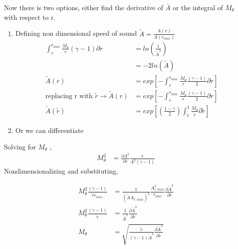 Now there is two options, either find the derivative of  $\bar{A}$ or the integral of
$M_{\theta}$ with respect to r.
\begin{enumerate}
    \item
%
Defining non dimensional speed of sound $\tilde{A} = \frac{A(r)}{A(r_{max})}$
\begin{align*}
\int_{r}^{r_{max}}\frac{M_{\theta}}{r}\left(\gamma - 1\right){\partial r}  &=ln\left(\frac{1}{\tilde{A}^2}\right) \\
&= -2ln(\tilde{A})\\
\tilde{A}(r) &= exp\left[-\int_{r}^{r_{max}}\frac{M_{\theta}}{r}\frac{\left(\gamma - 1\right)}{2}{\partial r}\right] \\ \text{replacing r with }\tilde{r} \rightarrow \tilde{A}(r) &= exp\left[-\int_{r}^{r_{max}}\frac{M_{\theta}}{r}\frac{\left(\gamma - 1\right)}{2}{\partial r}\right]		\\
\tilde{A}(\tilde{r}) &= exp\left[\left(\frac{1 - \gamma}{2}\right)\int_{\tilde{r}}^{1}\frac{M_{\theta}}{\tilde{r}}{\partial \tilde{r}}\right]	
\end{align*}
\item Or we can differentiate
\end{enumerate}
Solving for $M_{\theta}$ ,
\begin{align*}
M_{\theta}^2 
&= \frac{\partial A^2}{\partial r} \frac{r}{A^2 \left(\gamma - 1\right)}
\end{align*}
Nondimensionalizing and substituting, 

\begin{align} 
    M_{\theta}^2
    \frac{\left( \gamma - 1 \right)}{\widetilde{r} r_{max}} &=
    \frac{1}{(\widetilde{A}A_{r,max})^2}\frac{A_{r,max}^2}{r_{max}}
    \frac{\partial \widetilde{A}^2}{\partial \widetilde{r}} \nonumber \\
    M_{\theta}^2     \frac{\left( \gamma - 1 \right)}{\widetilde{r} } &=
    \frac{1}{\widetilde{A}^2}
    \frac{\partial \widetilde{A}^2}{\partial \widetilde{r}} \nonumber \\
    M_{\theta} &= \sqrt{\frac{\widetilde{r}}{(\gamma-1) \widetilde{A}^2}
        \frac{\partial\widetilde{A}^2}{\partial \widetilde{r} }
    } \label{eq:Mthetabackcalculated}
\end{align}

